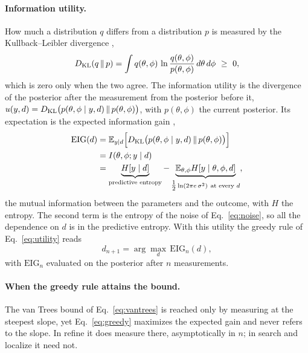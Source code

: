 \paragraph{Information utility.} How much a distribution $q$ differs from a distribution $p$ is measured by the
Kullback--Leibler divergence \cite{kullback1951},
\begin{equation}
  D_{\rm KL}(q\,\|\,p)=\int q(\theta,\phi)\,\ln\frac{q(\theta,\phi)}{p(\theta,\phi)}\,d\theta\,d\phi\ \ge\ 0,
  \label{eq:kl}
\end{equation}
which is zero only when the two agree. The information utility is the divergence of the posterior after the
measurement from the posterior before it, $u(y,d)=D_{\rm KL}\big(p(\theta,\phi\mid y,d)\,\|\,p(\theta,\phi)\big)$, with
$p(\theta,\phi)$ the current posterior. Its expectation is the expected information gain \cite{lindley1956},
\begin{align}
  \mathrm{EIG}(d)&=\mathbb E_{y\mid d}\Big[D_{\rm KL}\big(p(\theta,\phi\mid y,d)\,\|\,p(\theta,\phi)\big)\Big]
  \nonumber\\
  &=I(\theta,\phi;y\mid d)\nonumber\\
  &=\underbrace{H[y\mid d]}_{\text{predictive entropy}}
  -\underbrace{\mathbb E_{\theta,\phi} H[y\mid\theta,\phi,d]}_{\tfrac12\ln(2\pi e\,\sigma^2)\ \text{at every }d},
  \label{eq:eig-kl}
\end{align}
the mutual information \cite{cover2006} between the parameters and the outcome, with $H$ the entropy. The second
term is the entropy of the noise of Eq.~\eqref{eq:noise}, so all the dependence on $d$ is in the predictive entropy.
With this utility the greedy rule of Eq.~\eqref{eq:utility} reads
\begin{equation}
  d_{n+1}=\arg\max_d\,\mathrm{EIG}_n(d),
  \label{eq:greedy}
\end{equation}
with $\mathrm{EIG}_n$ evaluated on the posterior after $n$ measurements.

\paragraph{When the greedy rule attains the bound.} The van Trees bound of Eq.~\eqref{eq:vantrees} is reached only by
measuring at the steepest slope, yet Eq.~\eqref{eq:greedy} maximizes the expected gain and never refers to the
slope. In refine it does measure there, asymptotically in $n$; in search and localize it need not.

